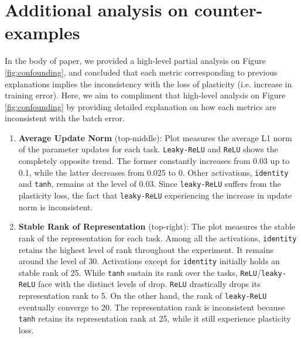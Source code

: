 

\section{Additional analysis on counter-examples}
\label{sec:appendix_analysis}
In the body of paper, we provided a high-level partial analysis on Figure \ref{fig:confounding}, and concluded that each metric corresponding to previous explanations implies the inconsistency with the loss of plasticity (i.e. increase in training error).
Here, we aim to compliment that high-level analysis on Figure \ref{fig:confounding} by providing detailed explanation on how each metrics are inconsistent with the batch error.

\begin{enumerate}
    \item \textbf{Average Update Norm} (top-middle):
    Plot measures the average L1 norm of the parameter updates for each task.
    \texttt{Leaky-ReLU} and \texttt{ReLU} shows the completely opposite trend.
    The former constantly increases from 0.03 up to 0.1, while the latter decreases from 0.025 to 0.
    Other activations, \texttt{identity} and \texttt{tanh}, remains at the level of 0.03.
    Since \texttt{leaky-ReLU} suffers from the plasticity loss, the fact that \texttt{leaky-ReLU} experiencing the increase in update norm is inconsistent.

    \item \textbf{Stable Rank of Representation} (top-right):
    The plot measures the stable rank of the representation for each task.
    Among all the activations, \texttt{identity} retains the highest level of rank throughout the experiment.
    It remains around the level of 30.
    Activations except for \texttt{identity} initially holds an stable rank of 25.
    While \texttt{tanh} sustain its rank over the tasks, \texttt{ReLU}/\texttt{leaky-ReLU} face with the distinct levels of drop.
    \texttt{ReLU} drastically drops its representation rank to 5.
    On the other hand, the rank of \texttt{leaky-ReLU} eventually converge to 20.
    The representation rank is inconsistent because  \texttt{tanh} retains its representation rank at 25, while it still experience plasticity loss.



\end{enumerate}
